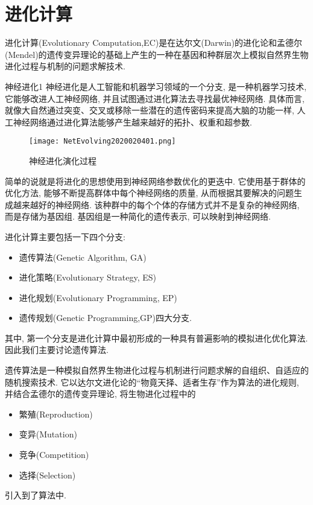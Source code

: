 \section{进化计算}
进化计算(Evolutionary Computation,EC)是在达尔文(Darwin)的进化论和孟德尔(Mendel)的遗传变异理论的基础上产生的一种在基因和种群层次上模拟自然界生物进化过程与机制的问题求解技术.
\begin{mydef}{神经进化}{1}
    神经进化是人工智能和机器学习领域的一个分支, 是一种机器学习技术, 它能够改进人工神经网络, 并且试图通过进化算法去寻找最优神经网络.
    具体而言, 就像大自然通过突变、交叉或移除一些潜在的遗传密码来提高大脑的功能一样, 人工神经网络通过进化算法能够产生越来越好的拓扑、权重和超参数.
\end{mydef}
\begin{figure}[H]
\centering
\texttt{[image: NetEvolving2020020401.png]}
\caption{神经进化演化过程}
\label{NetEvolving2020020401}
\end{figure}
简单的说就是将进化的思想使用到神经网络参数优化的更迭中.
它使用基于群体的优化方法, 能够不断提高群体中每个神经网络的质量, 从而根据其要解决的问题生成越来越好的神经网络.
该种群中的每个个体的存储方式并不是复杂的神经网络, 而是存储为基因组. 基因组是一种简化的遗传表示, 可以映射到神经网络.

进化计算主要包括一下四个分支:
\begin{itemize}
\item 遗传算法(Genetic Algorithm, GA)
\item 进化策略(Evolutionary Strategy, ES)
\item 进化规划(Evolutionary Programming, EP)
\item 遗传规划(Genetic Programming,GP)四大分支.
\end{itemize}
其中, 第一个分支是进化计算中最初形成的一种具有普遍影响的模拟进化优化算法. 因此我们主要讨论遗传算法.

遗传算法是一种模拟自然界生物进化过程与机制进行问题求解的自组织、自适应的随机搜索技术. 它以达尔文进化论的“物竟天择、适者生存”作为算法的进化规则, 并结合孟德尔的遗传变异理论, 将生物进化过程中的
\begin{itemize}
\item 繁殖(Reproduction)
\item 变异(Mutation)
\item 竞争(Competition)
\item 选择(Selection)
\end{itemize}
引入到了算法中.

